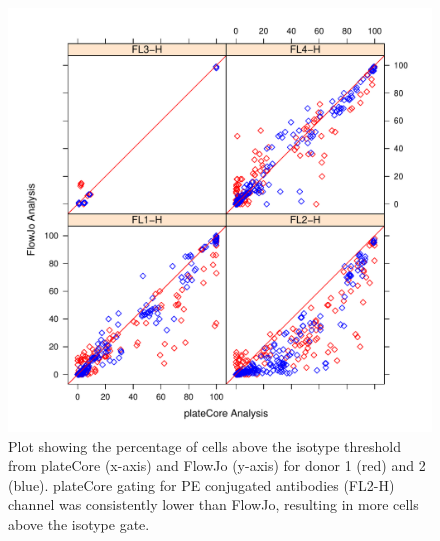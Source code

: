 \documentclass[12pt]{article}
\begin{document}
\begin{figure}
\centering
\includegraphics{rVSfjByFL.pdf}
\caption{Plot showing the percentage of cells above the isotype threshold
from plateCore (x-axis) and FlowJo (y-axis) for donor 1 (red) and 2 (blue).
plateCore gating for PE conjugated antibodies (FL2-H) channel was consistently
lower than FlowJo, resulting in more cells above the isotype gate.}
\label{fig:pcVSman1}
\end{figure}
\end{document}
